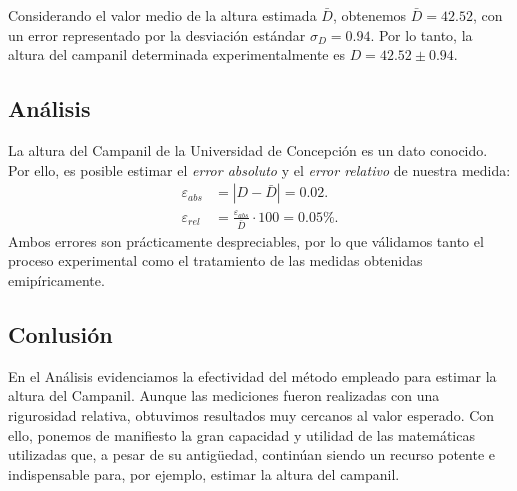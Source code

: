 \documentclass[10pt,a4paper]{article}
\begin{document}
\begin{multicols}{2}
Considerando el valor medio de la altura estimada $\bar{D}$, obtenemos $\bar{D} = 42.52$, con un error representado por la desviación estándar $\sigma_D = 0.94$. Por lo tanto, la altura del campanil determinada experimentalmente es $D = 42.52 \pm 0.94$.\\

\subsection*{Análisis}
La altura del Campanil de la Universidad de Concepción es un dato conocido. Por ello, es posible estimar el \emph{error absoluto} y el \emph{error relativo} de nuestra medida:
\begin{align}
\varepsilon_{abs} &= |D - \bar{D} | = 0.02. \\
\varepsilon_{rel} & = \frac{\varepsilon_{abs}}{\bar{D}} \cdot 100 =  0.05\%.
\end{align}
Ambos errores son prácticamente despreciables, por lo que válidamos tanto el proceso experimental como el tratamiento de las medidas obtenidas emipíricamente. 
\subsection*{Conlusión}
En el Análisis evidenciamos la efectividad del método empleado para estimar la altura del Campanil. Aunque las mediciones fueron realizadas con una rigurosidad relativa, obtuvimos resultados muy cercanos al valor esperado. Con ello, ponemos de manifiesto la gran capacidad y utilidad de las matemáticas utilizadas que, a pesar de su antigüedad, continúan siendo un recurso potente e indispensable para, por ejemplo, estimar la altura del campanil.


		
	\end{multicols}
	
	
	
\end{document}
